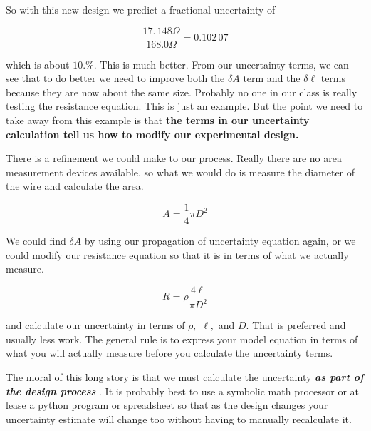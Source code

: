 \noindent So with this new design we predict a fractional uncertainty of

\begin{equation*}
	\frac{17.\,\allowbreak 148\unit{\Omega}}{168.0\unit{\Omega	}}=0.102\,07
\end{equation*}

which is about $\allowbreak 10.\%.$ This is much better. From our uncertainty terms, we can see that to do better we need to improve both the $\delta A$ term and the $\delta \ell $ terms because they are now about the same size. Probably no one in our class is really testing the resistance equation. This is just an example. But the point we need to take away from this example is that \textbf{the terms in our uncertainty calculation tell us how to modify our experimental design.}

There is a refinement we could make to our process. Really there are no area measurement devices available, so what we would do is measure the diameter of the wire and calculate the area.

\begin{equation*}
	A=\frac{1}{4}\pi D^{2}
\end{equation*}

We could find $\delta A$ by using our propagation of uncertainty equation again, or we could modify our resistance equation so that it is in terms of what we actually measure.

\begin{equation*}
	R=\rho \frac{4\ell }{\pi D^{2}}
\end{equation*}

\noindent and calculate our uncertainty in terms of $\rho ,$ $\ell ,$ and $D.$ That is preferred and usually less work. The general rule is to express your model equation in terms of what you will actually measure before you calculate the uncertainty terms.

The moral of this long story is that we must calculate the uncertainty \textbf{ \emph{as part of the design process} }. It is probably best to use a symbolic math processor or at lease a python program or spreadsheet so that as the design changes your uncertainty estimate will change too without having to manually recalculate it.


